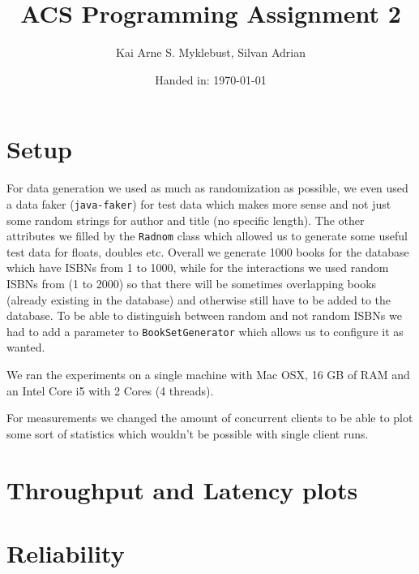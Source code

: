 \documentclass[12pt,a4paper]{article}
\begin{document}
\title{ACS Programming Assignment 2}
\subtitle{}

\author{Kai Arne S. Myklebust, Silvan Adrian}
\date{Handed in: \today}
	
\maketitle
\tableofcontents

\section{Setup}
For data generation we used as much as randomization as possible, we even used a data faker (\texttt{java-faker}) for test data which makes more sense and not just some random strings for author and title (no specific length).
The other attributes we filled by the \texttt{Radnom} class which allowed us to generate some useful test data for floats, doubles etc.
Overall we generate 1000 books for the database which have ISBNs from 1 to 1000, while for the interactions we used random ISBNs from (1 to 2000) so that there will be sometimes overlapping books (already existing in the database) and otherwise still have to be added to the database.
To be able to distinguish between random and not random ISBNs we had to add a parameter to \texttt{BookSetGenerator} which allows us to configure it as wanted.

We ran the experiments on a single machine with Mac OSX, 16 GB of RAM and an Intel Core i5 with 2 Cores (4 threads).

For measurements we changed the amount of concurrent clients to be able to plot some sort of statistics which wouldn't be possible with single client runs.

\section{Throughput and Latency plots}



\section{Reliability}
\end{document}

